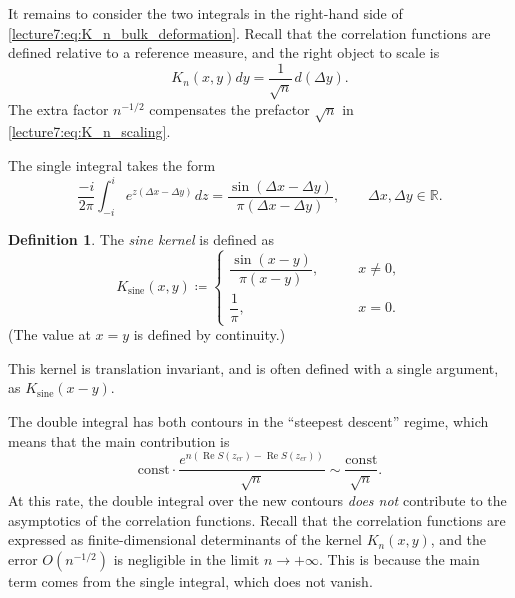 \documentclass[letterpaper,11pt,oneside,reqno]{book}
\numberwithin{equation}{chapter}  %
\newcommand{\ssp}{\hspace{1pt}}
\theoremstyle{definition}
\newtheorem{definition}[proposition]{Definition}
\begin{document}
It remains to consider the two integrals in the right-hand side
of \eqref{lecture7:eq:K_n_bulk_deformation}.
Recall that the correlation functions are
defined relative to a reference measure, and the right object to scale is
\begin{equation*}
	K_n(x,y)dy=\frac{1}{\sqrt n}\ssp d\left( \Delta y \right).
\end{equation*}
The extra factor $n^{-1/2}$
compensates the prefactor $\sqrt n$ in
\eqref{lecture7:eq:K_n_scaling}.

The single integral takes the form
\begin{equation}
	\label{lecture7:eq:K_n_bulk_single}
	\frac{-i}{2\pi}
	\int_{-i}^i
	e^{z (\Delta x -\Delta y)}
	\ssp
	dz
	=\frac{\sin\left( \Delta x-\Delta y \right)}{\pi(\Delta x-\Delta y)},
	\qquad \Delta x,\Delta y\in\mathbb{R}.
\end{equation}
\begin{definition}
	\label{lecture7:def:sine-kernel}
	The \emph{sine kernel} is defined as
	\begin{equation*}
		K_{\mathrm{sine}}(x,y)\coloneqq
		\begin{cases}
			\dfrac{\sin (x-y)}{\pi (x-y)},&\qquad x\ne 0,\\[10pt]
			\dfrac{1}{\pi},&\qquad x=0.
		\end{cases}
	\end{equation*}
	(The value at $x=y$ is defined by continuity.)

	This kernel is translation invariant, and is often
	defined with a single argument, as
	$K_{\mathrm{sine}}(x-y)$.
\end{definition}

The double integral has both contours
in the ``steepest descent'' regime, which means that
the main contribution is
\begin{equation*}
	\mathrm{const}\cdot
	\frac{e^{n\left( \operatorname{Re}S(z_{cr})-\operatorname{Re}S(z_{cr}) \right)}}{\sqrt n}
	\sim \frac{\mathrm{const}}{\sqrt n}.
\end{equation*}
At this rate, the double integral over the new contours
\emph{does not} contribute to the asymptotics of the correlation functions.
Recall that the correlation functions are expressed as finite-dimensional
determinants of the kernel $K_n(x,y)$, and the error $O(n^{-1/2})$ is
negligible in the limit $n\to+\infty$.
This is because the main term comes from the single integral,
which does not vanish.
\end{document}
